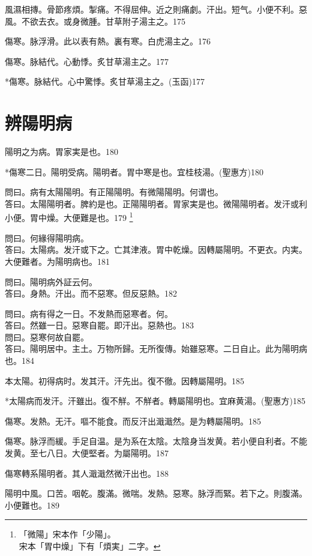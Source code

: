 \documentclass[12pt,twoside,UTF8,b5paper]{ctexbook}
\begin{document}
風濕相摶。骨節疼煩。掣痛。不得屈伸。近之則痛劇。汗出。短气。小便不利。惡風。不欲去衣。或身微腫。甘草附子湯主之。175

傷寒。脉浮滑。此以表有熱。裏有寒。白虎湯主之。176

傷寒。脉結代。心動悸。炙甘草湯主之。177

*傷寒。脉結代。心中驚悸。炙甘草湯主之。(玉函)177

\chapter{辨陽明病}

陽明之为病。胃家実是也。180

*傷寒二日。陽明受病。陽明者。胃中寒是也。宜桂枝湯。(聖惠方)180

問曰。病有太陽陽明。有正陽陽明。有微陽陽明。何谓也。\\
答曰。太陽陽明者。脾約是也。正陽陽明者。胃家実是也。微陽陽明者。发汗或利小便。胃中燥。大便難是也。179
	\footnote{「微陽」宋本作「少陽」。\\宋本「胃中燥」下有「煩実」二字。}

問曰。何緣得陽明病。\\
答曰。太陽病。发汗或下之。亡其津液。胃中乾燥。因轉屬陽明。不更衣。内実。大便難者。为陽明病也。181

問曰。陽明病外証云何。\\
答曰。身熱。汗出。而不惡寒。{但}反惡熱。182

問曰。病有得之一日。不发熱而惡寒者。何。\\
答曰。然雖一日。惡寒自罷。即汗出。惡熱也。183\\
問曰。惡寒何故自罷。\\
答曰。陽明居中。主土。万物所歸。无所復傳。始雖惡寒。二日自止。此为陽明病也。184

本太陽。初得病时。发其汗。汗先出{。復}不徹。因轉屬陽明。185

*太陽病而发汗。汗雖出。復不觧。不觧者。轉屬陽明也。宜麻黄湯。(聖惠方)185

傷寒。发熱。无汗。嘔不能食。而反汗出濈濈然。是为轉屬陽明。185

傷寒。脉浮而緩。手足自温。是为系在太陰。太陰{身}当发黄。若小便自利者。不能发黄。至七八日。大便堅者。为屬陽明。187

傷寒轉系陽明者。其人濈濈然微汗出也。188

陽明中風。口苦。咽乾。腹滿。微喘。发熱。惡寒。脉浮而緊。若下之。則腹滿。小便難也。189
\end{document}
